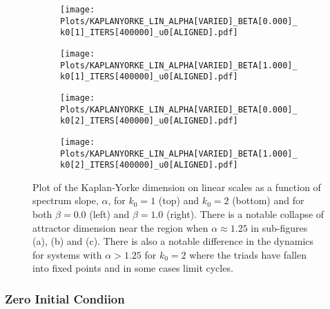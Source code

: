 \documentclass[9pt]{article}
\begin{document}
\begin{figure}[h!]
  \centering
  \begin{subfigure}[b]{0.49\linewidth}
    \texttt{[image: Plots/KAPLANYORKE\_LIN\_ALPHA[VARIED]\_BETA[0.000]\_k0[1]\_ITERS[400000]\_u0[ALIGNED].pdf]}
    \caption{}
  \end{subfigure}
  \begin{subfigure}[b]{0.49\linewidth}
    \texttt{[image: Plots/KAPLANYORKE\_LIN\_ALPHA[VARIED]\_BETA[1.000]\_k0[1]\_ITERS[400000]\_u0[ALIGNED].pdf]}
    \caption{}
  \end{subfigure}
  \begin{subfigure}[b]{0.49\linewidth}
    \texttt{[image: Plots/KAPLANYORKE\_LIN\_ALPHA[VARIED]\_BETA[0.000]\_k0[2]\_ITERS[400000]\_u0[ALIGNED].pdf]}
    \caption{}
  \end{subfigure}
   \begin{subfigure}[b]{0.49\linewidth}
    \texttt{[image: Plots/KAPLANYORKE\_LIN\_ALPHA[VARIED]\_BETA[1.000]\_k0[2]\_ITERS[400000]\_u0[ALIGNED].pdf]}
    \caption{}
  \end{subfigure}
  \caption{Plot of the Kaplan-Yorke dimension on linear scales as a function of spectrum slope, $\alpha$, for $k_0 = 1$ (top) and $k_0 = 2$ (bottom) and for both $\beta = 0.0$ (left) and $\beta = 1.0$ (right). There is a notable collapse of attractor dimension near the region when $\alpha \approx 1.25$ in sub-figures (a), (b) and (c). There is also a notable difference in the dynamics for systems with $\alpha > 1.25$ for $k_0 = 2$ where the triads have fallen into fixed points and in some cases limit cycles.}
  \label{fig:1_lin}
\end{figure}

\subsubsection{Zero Initial Condiion}
\end{document}
